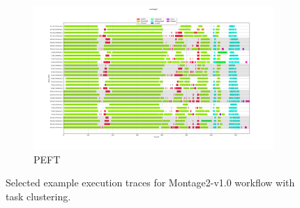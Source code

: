 \begin{figure}[H]
\begin{subfigure}{0.75\textwidth}
\label{fig:evaluation:agglo:m10:heft}
\end{subfigure}
\begin{subfigure}{0.75\textwidth}
\centering
\includegraphics[width=1\linewidth]{figures/6-2-m1.0-agglo-peft.png}
\caption[Selected example execution traces for Montage2-v1.0 workflow with PEFT and task clustering]{PEFT}
\label{fig:evaluation:agglo:m10:peft}
\end{subfigure}
\centering
\caption[Selected example execution traces for Montage2-v1.0 workflow with task clustering]{Selected example execution traces for Montage2-v1.0 workflow with task clustering.}
\label{fig:evaluation:agglo:m10:plugin}
\end{figure}






